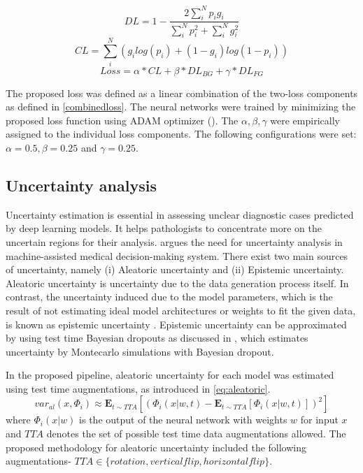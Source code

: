 \documentclass[times,twocolumn,final,authoryear]{tmp}
\begin{document}
\begin{equation}
    DL = 1 - \frac{2\sum_i ^N p_i g_i}{ \sum_i^N p_i^2+ \sum_i^N g_i^2}
    \label{diceloss}
\end{equation}
\begin{equation}
    CL = \sum_i ^N \left(g_ilog(p_i) + (1 - g_i)log(1-p_i)\right)
    \label{crossentropyloss}
\end{equation}
\begin{equation}
 Loss = \alpha*CL + \beta*DL_{BG} + \gamma*DL_{FG} 
 \label{combinedloss}
\end{equation}

The proposed loss was defined as a linear combination of the two-loss components as defined in \ref{combinedloss}. The neural networks were trained by minimizing the proposed loss function using ADAM optimizer (\citep{kingma2014adam}). The $\alpha, \beta, \gamma$  were empirically assigned to the individual loss components.  The following configurations were set: $ \alpha = 0.5, \beta = 0.25$ and $\gamma = 0.25$.


\subsection{Uncertainty analysis}
\label{path_sec:path_uncertainty}
Uncertainty estimation is essential in assessing unclear diagnostic cases predicted by deep learning models. It helps pathologists to concentrate more on the uncertain regions for their analysis.  \citep{begoli2019need} argues the need for uncertainty analysis in machine-assisted medical decision-making system. There exist two main sources of uncertainty, namely (i) Aleatoric uncertainty and (ii) Epistemic uncertainty. Aleatoric uncertainty is uncertainty due to the data generation process itself. In contrast, the uncertainty induced due to the model parameters, which is the result of not estimating ideal model architectures or weights to fit the given data, is known as epistemic uncertainty \citep{kendall2017uncertainties}. Epistemic uncertainty can be approximated by using test time Bayesian dropouts as discussed in \citep{leibig2017leveraging}, which estimates uncertainty by Montecarlo simulations with Bayesian dropout. 

In the proposed pipeline, aleatoric uncertainty for each model was estimated using test time augmentations, as introduced in \citep{gal2016dropout} \ref{eq:aleatoric}. 
\begin{equation}
 var_{al}(x, \Phi_i) \approx \mathbf{E}_{t \sim TTA}[(\Phi_i(x|w,t) -  \mathbf{E}_{t \sim TTA}[\Phi_i(x|w,t)])^2]
\label{eq:aleatoric}
\end{equation}
where $\Phi_i(x|w)$ is the output of the neural network with weights $w$ for input $x$ and $TTA$ denotes the set of possible test time data augmentations allowed. The proposed methodology for aleatoric uncertainty included the following augmentations- $TTA \in \{rotation, vertical flip, horizontal flip\}$.
\end{document}
